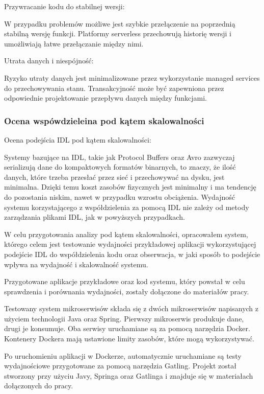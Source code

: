 \documentclass[runningheads,12pt]{llncs}
\begin{document}
Przywracanie kodu do stabilnej wersji: 

W przypadku problemów możliwe jest szybkie przełączenie na poprzednią stabilną wersję funkcji. Platformy serverless przechowują historię wersji i umożliwiają łatwe przełączanie między nimi. ~\cite[p. 289]{roberts2018cloud}

Utrata danych i niespójność: 

Ryzyko utraty danych jest minimalizowane przez wykorzystanie managed services do przechowywania stanu. Transakcyjność może być zapewniona przez odpowiednie projektowanie przepływu danych między funkcjami. ~\cite[p. 312]{roberts2018cloud}

\newpage
\subsubsection{Ocena wspówdzieleina pod kątem skalowalności}

Ocena podejścia IDL pod kątem skalowalności:

Systemy bazujące na IDL, takie jak Protocol Buffers oraz Avro zazwyczaj serializują dane do kompaktowych formatów binarnych, to znaczy, że ilość danych, które trzeba przesłać przez sieć i przechowywać na dysku, jest minimalna. Dzięki temu koszt zasobów fizycznych jest minimalny i ma tendencję do pozostania niskim, nawet w przypadku wzrostu obciążenia. Wydajność systemu korzystającego z współdzielenia za pomocą IDL nie zależy od metody zarządzania plikami IDL, jak w powyższych przypadkach.

W celu przygotowania analizy pod kątem skalowalności, opracowałem system, którego celem jest testowanie wydajności przykładowej aplikacji wykorzystującej podejście IDL do współdzielenia kodu oraz obserwacja, w jaki sposób to podejście wpływa na wydajność i skalowalność systemu.

Przygotowane aplikacje przykładowe oraz kod systemu, który powstał w celu sprawdzenia i porównania wydajności, zostały dołączone do materiałów pracy.

Testowany system mikroserwisów składa się z dwóch mikroserwisów napisanych z użyciem technologii Java oraz Spring. Pierwszy mikroserwis produkuje dane, drugi je konsumuje. Oba serwisy uruchamiane są za pomocą narzędzia Docker. Kontenery Dockera mają ustawione limity zasobów, które mogą wykorzystywać.

Po uruchomieniu aplikacji w Dockerze, automatycznie uruchamiane są testy wydajnościowe przygotowane za pomocą narzędzia Gatling. Projekt został stworzony przy użyciu Javy, Springa oraz Gatlinga i znajduje się w materiałach dołączonych do pracy.
\end{document}
